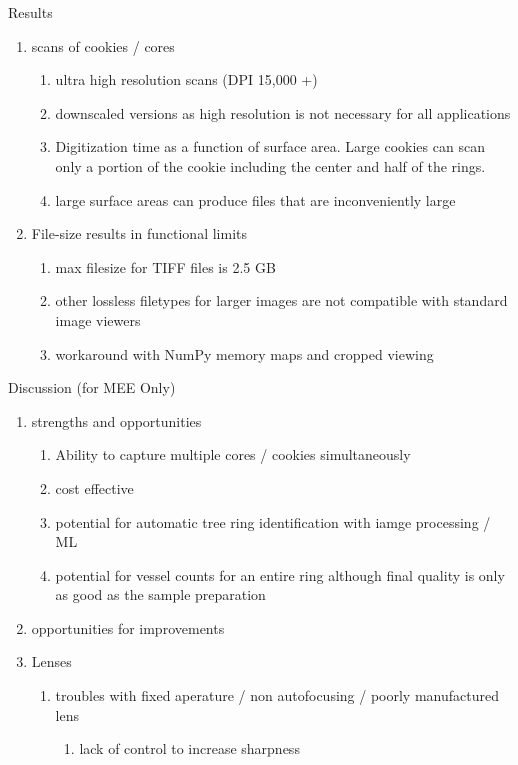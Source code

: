 \documentclass{article}
\begin{document}
\begin{outline}[enumerate]
\item Results
	\begin{enumerate}
	\item scans of cookies / cores
		\begin{enumerate}
		\item ultra high resolution scans (DPI 15,000 +)
		\item downscaled versions as high resolution is not necessary for all applications
		\item Digitization time as a function of surface area. Large cookies can scan only a portion of the cookie including the center and half of the rings.
		\item large surface areas can produce files that are inconveniently large
		\end{enumerate}
	\item File-size results in functional limits 
		\begin{enumerate}
		\item max filesize for TIFF files is 2.5 GB
		\item other lossless filetypes for larger images are not compatible with standard image viewers
		\item workaround with NumPy memory maps and cropped viewing 
		\end{enumerate}
	\end{enumerate}
\item Discussion (for MEE Only)
	\begin{enumerate}
	\item strengths and opportunities
		\begin{enumerate}
		\item  Ability to capture multiple cores / cookies simultaneously
		\item cost effective
		\item potential for automatic tree ring identification with iamge processing / ML 
		\item potential for vessel counts for an entire ring 
		\subitem although final quality is only as good as the sample preparation
		\end{enumerate}
	\item opportunities for improvements
		\item Lenses
			\begin{enumerate}
			\item troubles with fixed aperature / non autofocusing / poorly manufactured lens
				\begin{enumerate}
				\item lack of control to increase sharpness

\end{enumerate}
\end{enumerate}
\end{enumerate}
\end{outline}
\end{document}
